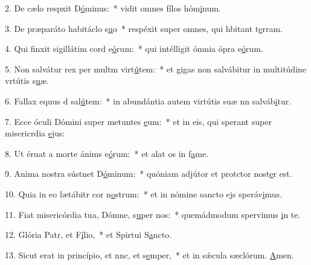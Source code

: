 2. De cælo respxit D\uline{ó}minus:~* vidit omnes fílos hóm\uline{i}num.\par 
3. De præparáto habitáclo s\uline{u}o~* respéxit super omnes, qui hbitant t\uline{e}rram.\par 
4. Qui finxit sigillátim cord e\uline{ó}rum:~* qui intélligit ómnia ópra e\uline{ó}rum.\par 
5. Non salvátur rex per multm virt\uline{ú}tem:~* et gigas non salvábitur in multitúdine vrtútis s\uline{u}æ.\par 
6. Fallax equus d sal\uline{ú}tem:~* in abundántia autem virtútis suæ nn salváb\uline{i}tur.\par 
7. Ecce óculi Dómini super metuntes \uline{e}um:~* et in eis, qui sperant super misericrdia \uline{e}jus:\par 
8. Ut éruat a morte ánims e\uline{ó}rum:~* et alat os in f\uline{a}me.\par 
9. Anima nostra sústnet D\uline{ó}minum:~* quóniam adjútor et protctor nost\uline{e}r est.\par 
10. Quia in eo lætábitr cor n\uline{o}strum:~* et in nómine sancto ejs speráv\uline{i}mus.\par 
11. Fiat misericórdia tua, Dómne, s\uline{u}per nos:~* quemádmodum spervimus \uline{i}n te.\par 
12. Glória Patr, et F\uline{í}lio,~* et Spirtui S\uline{a}ncto.\par 
13. Sicut erat in princípio, et nnc, et s\uline{e}mper,~* et in sǽcula sæclórum. \uline{A}men.\par 
